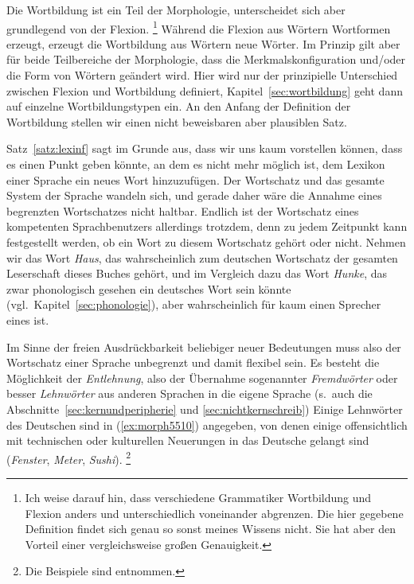 \label{sec:defwb}

Die Wortbildung ist ein Teil der Morphologie, unterscheidet sich aber grundlegend von der Flexion.%
\footnote{Ich weise darauf hin, dass verschiedene Grammatiker Wortbildung und Flexion anders und unterschiedlich voneinander abgrenzen.
Die hier gegebene Definition findet sich genau so sonst meines Wissens nicht.
Sie hat aber den Vorteil einer vergleichsweise großen Genauigkeit.}
Während die Flexion aus Wörtern Wortformen erzeugt, erzeugt die Wortbildung aus Wörtern neue Wörter.
Im Prinzip gilt aber für beide Teilbereiche der Morphologie, dass die Merkmalskonfiguration und\slash oder die Form von Wörtern geändert wird.
Hier wird nur der prinzipielle Unterschied zwischen Flexion und Wortbildung definiert, Kapitel~\ref{sec:wortbildung} geht dann auf einzelne Wortbildungstypen ein.
An den Anfang der Definition der Wortbildung stellen wir einen nicht beweisbaren aber plausiblen Satz.


Satz~\ref{satz:lexinf} sagt im Grunde aus, dass wir uns kaum vorstellen können, dass es einen Punkt geben könnte, an dem es nicht mehr möglich ist, dem Lexikon einer Sprache ein neues Wort hinzuzufügen.
Der Wortschatz und das gesamte System der Sprache wandeln sich, und gerade daher wäre die Annahme eines begrenzten Wortschatzes nicht haltbar.
Endlich ist der Wortschatz eines kompetenten Sprachbenutzers allerdings trotzdem, denn zu jedem Zeitpunkt kann festgestellt werden, ob ein Wort zu diesem Wortschatz gehört oder nicht.
Nehmen wir das Wort \textit{Haus}, das wahrscheinlich zum deutschen Wortschatz der gesamten Leserschaft dieses Buches gehört, und im Vergleich dazu das Wort \textit{Hunke}, das zwar phonologisch gesehen ein deutsches Wort sein könnte (vgl.\ Kapitel~\ref{sec:phonologie}), aber wahrscheinlich für kaum einen Sprecher eines ist.

Im Sinne der freien Ausdrückbarkeit beliebiger neuer Bedeutungen muss also der Wortschatz einer Sprache unbegrenzt und damit flexibel sein.
Es besteht die Möglichkeit der \textit{Entlehnung}, also der Übernahme sogenannter \textit{Fremdwörter} oder besser \textit{Lehnwörter} aus anderen Sprachen in die eigene Sprache (s.\ auch die Abschnitte~\ref{sec:kernundperipherie} und \ref{sec:nichtkernschreib})
Einige Lehnwörter des Deutschen sind in (\ref{ex:morph5510}) angegeben, von denen einige offensichtlich mit technischen oder kulturellen Neuerungen in das Deutsche gelangt sind (\textit{Fenster}, \textit{Meter}, \textit{Sushi}).%
\footnote{Die Beispiele sind \citet{Kluge02} entnommen.}

